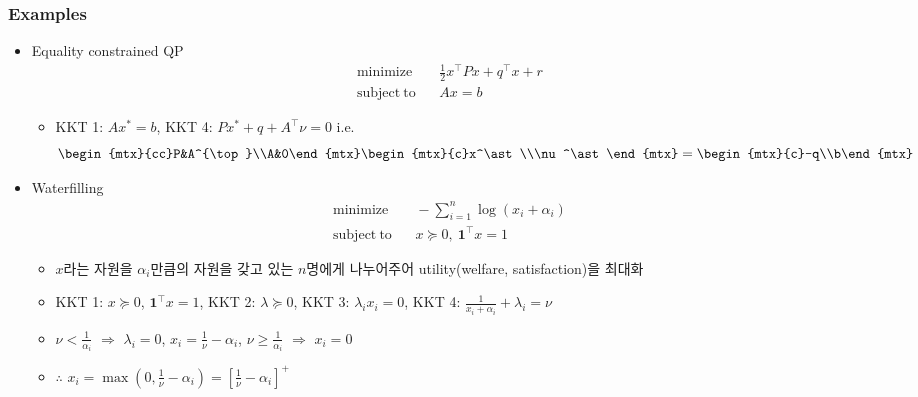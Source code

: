\subsubsection*{Examples}
\begin{itemize}
    \item Equality constrained QP
    \begin{equation}\begin{aligned}
        \mathrm{minimize}~~&~~\frac{1}{2}x^{\top}Px + q^{\top}x + r \\
        \mathrm{subject~to}~~&~~Ax = b
    \end{aligned}\end{equation}
    \begin{itemize}
        \item KKT 1: $Ax^\ast = b$, KKT 4: $Px^\ast + q + A^{\top}\nu = 0$ i.e.
        \begin{equation}
            \begin{mtx}{cc}P&A^{\top}\\A&0\end{mtx}\begin{mtx}{c}x^\ast\\\nu^\ast\end{mtx}=\begin{mtx}{c}-q\\b\end{mtx}
        \end{equation}
    \end{itemize}
    \item Waterfilling
    \begin{equation}\begin{aligned}
        \mathrm{minimize}~~&~~-\sum_{i=1}^n \log(x_i + \alpha_i) \\
        \mathrm{subject~to}~~&~~x\succeq 0,~\mathbf{1}^{\top}x = 1
    \end{aligned}\end{equation}
    \begin{itemize}
        \item $x$라는 자원을 $\alpha_i$만큼의 자원을 갖고 있는 $n$명에게 나누어주어 utility(welfare, satisfaction)을 최대화
        \item KKT 1: $x\succeq 0$, $\mathbf{1}^{\top}x = 1$, KKT 2: $\lambda\succeq 0$, KKT 3: $\lambda_i x_i = 0$, KKT 4: $\frac{1}{x_i+\alpha_i}+\lambda_i=\nu$
        \item $\nu<\frac{1}{\alpha_i}$ $\Rightarrow$ $\lambda_i=0$, $x_i = \frac{1}{\nu}-\alpha_i$, $\nu\geq\frac{1}{\alpha_i}$ $\Rightarrow$ $x_i = 0$
        \item $\therefore$ $x_i = \max(0, \frac{1}{\nu}-\alpha_i) = \left[\frac{1}{\nu}-\alpha_i\right]^+$
    \end{itemize}
    \begin{figures}
    \end{figures}
\end{itemize}


